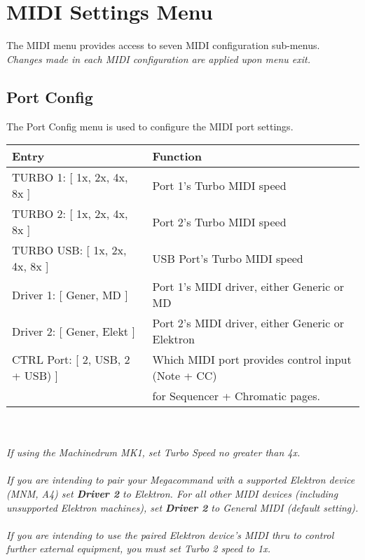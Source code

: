 \chapter{MIDI Settings Menu}
The MIDI menu provides access to seven MIDI configuration sub-menus.
\\
\textit{Changes made in each MIDI configuration are applied upon menu exit.}

\section{Port Config}
The Port Config menu is used to configure the MIDI port settings.
\\
\begin{tabular}{|l|l|}
\hline
\rowcolor[HTML]{C0C0C0} 
Entry                                  & Function                                                                       \\ \hline
TURBO 1: {[} 1x, 2x, 4x, 8x {]}        & Port 1's Turbo MIDI speed                                                             \\ \hline
TURBO 2: {[} 1x, 2x, 4x, 8x {]}        & Port 2's Turbo MIDI speed                                                             \\ \hline
TURBO USB: {[} 1x, 2x, 4x, 8x {]}      & USB Port's Turbo MIDI speed                                                           \\ \hline
Driver 1: {[} Gener, MD {]}         &  Port 1's MIDI driver, either Generic or MD                                   \\ \hline
Driver 2: {[} Gener, Elekt {]}         &  Port 2's MIDI driver, either Generic or Elektron                                   \\ \hline
CTRL Port: {[} 2, USB, 2 + USB) {]}    & Which MIDI port provides control input (Note + CC)\\& for Sequencer + Chromatic pages.  \\ \hline                                    
\end{tabular}
\\\\
\textit{If using the Machinedrum MK1, set Turbo Speed no greater than 4x.}\\\\
\textit{{If you are intending to pair your Megacommand with a supported Elektron device}
(MNM, A4) set \textbf{Driver 2}  to Elektron. For all other MIDI devices (including unsupported Elektron machines), set \textbf{Driver 2} to General MIDI (default setting).}\\\\
\textit{If you are intending to use the paired Elektron device's MIDI thru to control further external equipment, you must set Turbo 2 speed to 1x.}

